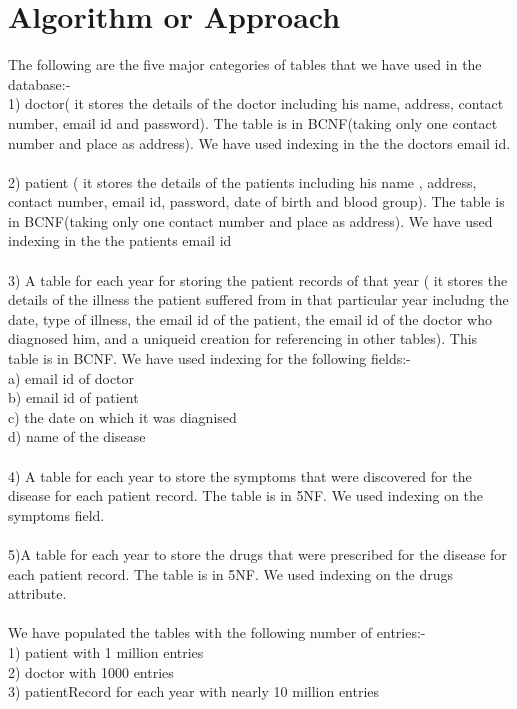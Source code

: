 \documentclass{article}
\begin{document}
\section{Algorithm or Approach}

The following are the five major categories of tables that we have used in the database:-
\\
1) doctor( it stores the details of the doctor including his name, address, contact number, email id and password). The table is in BCNF(taking only one contact number and place as address). We have used indexing in the the doctors email id.\\\\
2) patient ( it stores the details of the patients including his name , address, contact number, email id, password, date of birth and blood group). The table is in BCNF(taking only one contact number and place as address). We have used indexing in the the patients email id\\\\
3) A table for each year for storing the patient records of that year ( it stores the details of the illness the patient suffered from in that particular year includng the date, type of illness, the email id of the patient, the email id of the doctor who diagnosed him, and a uniqueid creation for referencing in other tables). This table is in BCNF. We have used indexing for the following fields:-\\ 
a) email id of doctor\\
b) email id of patient\\
c) the date on which it was diagnised\\
d) name of the disease\\\\
4) A table for each year to store the symptoms that were discovered for the disease for each patient record. The table is in 5NF. We used indexing on the symptoms field.\\\\
5)A table for each year to store the drugs that were prescribed for the disease for each patient record. The table is in 5NF. We used indexing on the drugs attribute.\\\\
We have populated the tables with the following number of entries:-\\
1) patient with 1 million entries\\
2) doctor with 1000 entries\\
3) patientRecord for each year with nearly 10 million entries
\end{document}
